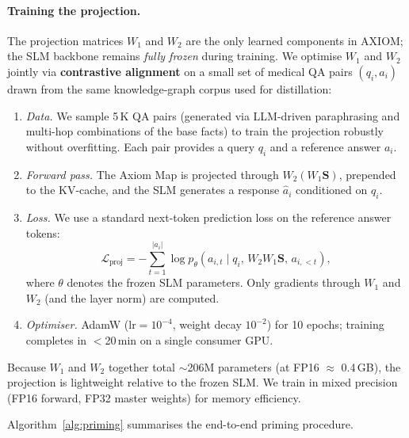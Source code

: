 \documentclass[11pt,a4paper]{article}
\begin{document}
\paragraph{Training the projection.}
The projection matrices $W_1$ and $W_2$ are the only learned components
in AXIOM; the SLM backbone remains \emph{fully frozen} during training.
We optimise $W_1$ and $W_2$ jointly via \textbf{contrastive alignment}
on a small set of medical QA pairs $(q_i, a_i)$ drawn from the same
knowledge-graph corpus used for distillation:
\begin{enumerate}[nosep]
    \item \emph{Data.}  We sample 5\,K QA pairs (generated via
          LLM-driven paraphrasing and multi-hop combinations of the
          base facts) to train the projection robustly without
          overfitting.  Each pair provides a query $q_i$ and a
          reference answer $a_i$.
    \item \emph{Forward pass.}  The Axiom Map is projected through
          $W_2(W_1 \mathbf{S})$, prepended to the KV-cache, and the SLM
          generates a response $\hat{a}_i$ conditioned on $q_i$.
    \item \emph{Loss.}  We use a standard next-token prediction loss
          on the reference answer tokens:
          \begin{equation}
              \mathcal{L}_{\text{proj}} = -\sum_{t=1}^{|a_i|}
              \log p_{\theta}\!\left(a_{i,t} \mid q_i,\,
              W_2 W_1 \mathbf{S},\, a_{i,<t}\right),
              \label{eq:proj_loss}
          \end{equation}
          where $\theta$ denotes the frozen SLM parameters.  Only gradients
          through $W_1$ and $W_2$ (and the layer norm) are computed.
    \item \emph{Optimiser.}  AdamW ($\text{lr}=10^{-4}$, weight
          decay $10^{-2}$) for 10 epochs; training completes in
          $<$20\,min on a single consumer GPU.
\end{enumerate}
Because $W_1$ and $W_2$ together total $\sim$206M parameters
(at FP16 $\approx$ 0.4\,GB), the projection is lightweight relative
to the frozen SLM.  We train in mixed precision (FP16 forward, FP32
master weights) for memory efficiency.

Algorithm~\ref{alg:priming} summarises the end-to-end priming procedure.
\end{document}

